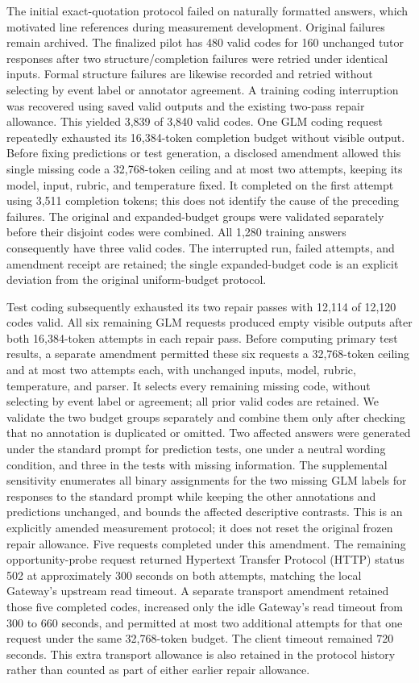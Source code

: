The initial exact-quotation protocol failed on naturally formatted answers,
which motivated line references during measurement development. Original
failures remain archived. The finalized pilot has 480 valid codes for 160
unchanged tutor responses after two structure/completion failures were retried
under identical inputs. Formal structure failures are likewise recorded and
retried without selecting by event label or annotator agreement.
A training coding interruption was recovered using saved valid outputs and
the existing two-pass repair allowance. This yielded 3,839 of 3,840 valid codes.
One GLM coding request repeatedly exhausted its 16,384-token completion budget
without visible output. Before fixing predictions or test generation, a
disclosed amendment allowed this single missing code a 32,768-token ceiling
and at most two attempts, keeping its model, input, rubric, and temperature
fixed. It completed on the first attempt using 3,511 completion tokens; this
does not identify the cause of the preceding failures. The original and
expanded-budget groups were validated separately before their disjoint codes
were combined. All 1,280 training answers consequently have three valid codes.
The interrupted run, failed attempts, and amendment receipt are retained; the
single expanded-budget code is an explicit deviation from the original
uniform-budget protocol.

Test coding subsequently exhausted its two repair passes with 12,114
of 12,120 codes valid. All six remaining GLM requests produced empty visible
outputs after both 16,384-token attempts in each repair pass. Before computing
primary test results, a separate amendment permitted these six requests
a 32,768-token ceiling and at most two attempts each, with unchanged inputs,
model, rubric, temperature, and parser. It selects every remaining missing code,
without selecting by event label or agreement; all prior valid codes are retained.
We validate the two budget groups separately and combine them only after
checking that no annotation is duplicated or omitted.
Two affected answers were generated under the standard prompt for prediction tests, one under a neutral
wording condition, and three in the tests with missing information. The
supplemental sensitivity enumerates all binary assignments for the two missing
GLM labels for responses to the standard prompt while keeping the other annotations and predictions unchanged, and
bounds the affected descriptive contrasts. This is an explicitly amended
measurement protocol; it does not reset the original frozen repair allowance.
Five requests completed under this amendment. The remaining opportunity-probe
request returned Hypertext Transfer Protocol (HTTP) status 502 at approximately
300 seconds on both attempts,
matching the local Gateway's upstream read timeout. A separate transport
amendment retained those five completed codes, increased only the idle
Gateway's read timeout from 300 to 660 seconds, and permitted at most two
additional attempts for that one request under the same 32,768-token budget.
The client timeout remained 720 seconds. This extra transport allowance is
also retained in the protocol history rather than counted as part of either
earlier repair allowance.


